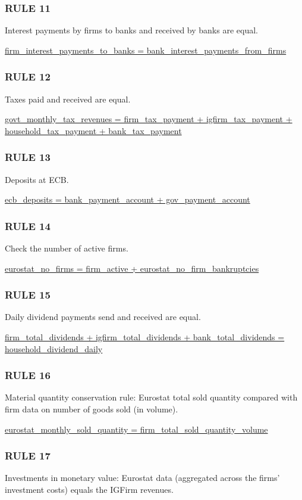 \subsubsection*{RULE 11}
Interest payments by firms to banks and received by banks are equal.

\bigskip
\url{firm_interest_payments_to_banks = bank_interest_payments_from_firms}

\subsubsection*{RULE 12}
Taxes paid and received are equal.

\bigskip
\url{govt_monthly_tax_revenues = firm_tax_payment + igfirm_tax_payment + household_tax_payment + bank_tax_payment}

\subsubsection*{RULE 13}
Deposits at ECB.

\bigskip
\url{ecb_deposits = bank_payment_account + gov_payment_account}

\subsubsection*{RULE 14}
Check the number of active firms.

\bigskip
\url{eurostat_no_firms = firm_active + eurostat_no_firm_bankruptcies}

\subsubsection*{RULE 15}
Daily dividend payments send and received are equal.

\bigskip
\url{firm_total_dividends + igfirm_total_dividends + bank_total_dividends = household_dividend_daily}

\subsubsection*{RULE 16}
Material quantity conservation rule: Eurostat total sold quantity compared with firm data on number of goods sold (in volume).

\bigskip
\url{eurostat_monthly_sold_quantity = firm_total_sold_quantity_volume}

\subsubsection*{RULE 17}
Investments in monetary value: Eurostat data (aggregated across the firms' investment costs) equals the IGFirm revenues.

